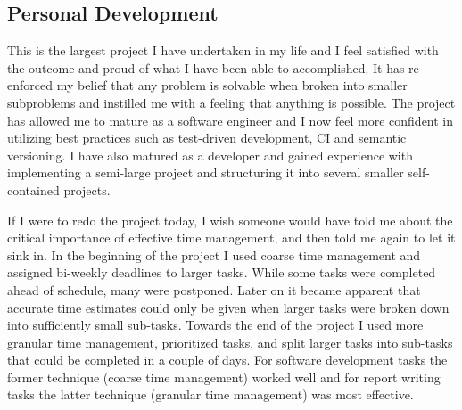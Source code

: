 
\subsection{Personal Development}

This is the largest project I have undertaken in my life and I feel satisfied with the outcome and proud of what I have been able to accomplished. It has re-enforced my belief that any problem is solvable when broken into smaller subproblems and instilled me with a feeling that anything is possible. The project has allowed me to mature as a software engineer and I now feel more confident in utilizing best practices such as test-driven development, CI and semantic versioning. I have also matured as a developer and gained experience with implementing a semi-large project and structuring it into several smaller self-contained projects.

If I were to redo the project today, I wish someone would have told me about the critical importance of effective time management, and then told me again to let it sink in. In the beginning of the project I used coarse time management and assigned bi-weekly deadlines to larger tasks. While some tasks were completed ahead of schedule, many were postponed. Later on it became apparent that accurate time estimates could only be given when larger tasks were broken down into sufficiently small sub-tasks. Towards the end of the project I used more granular time management, prioritized tasks, and split larger tasks into sub-tasks that could be completed in a couple of days. For software development tasks the former technique (coarse time management) worked well and for report writing tasks the latter technique (granular time management) was most effective.
